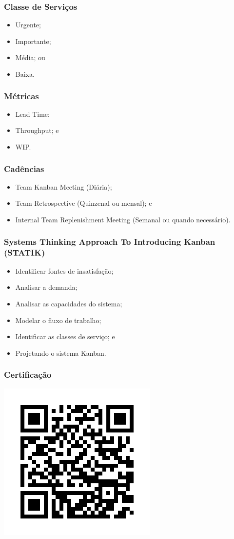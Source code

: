 \documentclass[aspectratio=169]{beamer}
\begin{document}
\begin{frame}
	\frametitle{Classe de Servi\c cos}
	
	\begin{itemize}
		\item Urgente;
		\item Importante;
		\item Média; ou
		\item Baixa.
	\end{itemize}
\end{frame}

\begin{frame}
	\frametitle{Métricas}
	
	\begin{itemize}
		\item Lead Time;
		\item Throughput; e
		\item WIP.
	\end{itemize}
\end{frame}

\begin{frame}
	\frametitle{Cadências}
	
	\begin{itemize}
		\item Team Kanban Meeting (Diária);
		\item Team Retrospective (Quinzenal ou mensal); e
		\item Internal Team Replenishment Meeting (Semanal ou quando
necessário).
	\end{itemize}
\end{frame}

\begin{frame}
	\frametitle{Systems Thinking Approach To Introducing Kanban (STATIK)}
	
	\begin{itemize}
		\item Identificar fontes de insatisfação;
		\item Analisar a demanda;
		\item Analisar as capacidades do sistema;
		\item Modelar o fluxo de trabalho;
		\item Identificar as classes de serviço; e
		\item Projetando o sistema Kanban.
	\end{itemize}
\end{frame}


\begin{frame}
	\frametitle{Certifica\c cão}
	
	\begin{center}
		\includegraphics[scale=0.5]{img/qrcode}
	\end{center}
\end{frame}
\end{document}
